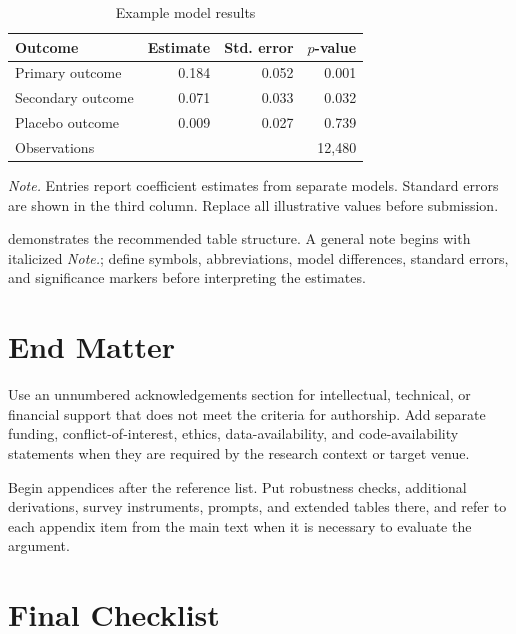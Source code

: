 \documentclass{templates/aidealabs-paper}
\begin{document}
\begin{table}[htbp]
  \centering
  \begin{minipage}{0.86\textwidth}
    \centering
    \caption{Example model results}
    \label{tab:results}
    \begin{tabularx}{\textwidth}{Xrrr}
      \toprule
      Outcome & Estimate & Std. error & $p$-value \\
      \midrule
      Primary outcome   & 0.184 & 0.052 & 0.001 \\
      Secondary outcome & 0.071 & 0.033 & 0.032 \\
      Placebo outcome   & 0.009 & 0.027 & 0.739 \\
      \midrule
      Observations      & \multicolumn{3}{r}{12,480} \\
      \bottomrule
    \end{tabularx}
    \vspace{0.45em}
    {\footnotesize\raggedright\textit{Note.} Entries report coefficient estimates from separate models. Standard errors are shown in the third column. Replace all illustrative values before submission.\par}
  \end{minipage}
\end{table}

 demonstrates the recommended table structure. A general note begins with italicized \textit{Note.}; define symbols, abbreviations, model differences, standard errors, and significance markers before interpreting the estimates.

\section{End Matter}
\label{sec:end-matter}

Use an unnumbered acknowledgements section for intellectual, technical, or financial support that does not meet the criteria for authorship. Add separate funding, conflict-of-interest, ethics, data-availability, and code-availability statements when they are required by the research context or target venue.

Begin appendices after the reference list. Put robustness checks, additional derivations, survey instruments, prompts, and extended tables there, and refer to each appendix item from the main text when it is necessary to evaluate the argument.

\section{Final Checklist}
\label{sec:checklist}
\end{document}
